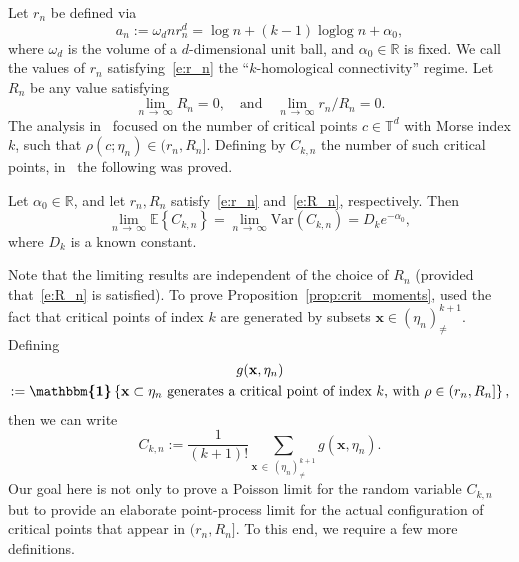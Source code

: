 \documentclass[10pt]{amsart}
\theoremstyle{definition}\newtheorem{defi}[theo]{Definition}\newtheorem{rema}[theo]{Remark}\newtheorem{exam}[theo]{Example}\newtheorem{exem}[theo]{Example}\newtheorem{nota}[theo]{Notation}
\DeclareMathOperator{\logg}{\log\log}
\newcommand{\bx}{\mathbf{x}}
\newcommand*\R{\mathbb{R}}
\newcommand*\T{\mathbb{T}}
\newcommand{\E}{\mathbb{E}}
\newcommand{\mean}[1] {\E\left\{{#1}\right\}}
\newcommand{\ind}{\boldsymbol{\mathbbm{1}}}
\newcommand{\var}[1]{\mathrm{Var}\param{{#1}}}
\newcommand{\param}[1]{\left(#1\right)}
\newcommand{\ninf}{n\,\to\,\infty}
\newcommand{\limninf}{\lim_{\ninf}}
\begin{document}
Let $r_n$ be defined via
\begin{equation}\label{e:r_n}
a_n := \omega_d nr_n^d = \log n + (k-1)\logg n + \alpha_0,
\end{equation}
where $\omega_d$ is the volume of a $d$-dimensional unit ball, and $\alpha_0\in \R$ is fixed. We call the values of $r_n$ satisfying~\eqref{e:r_n} the ``$k$-homological connectivity'' regime. Let $R_n$ be any value satisfying
\begin{equation}\label{e:R_n}
\limninf R_n =0,\quad\text{and}\quad\limninf r_n/R_n = 0.
\end{equation} The analysis in~\cite{Bobrowski2019} focused on the number of critical points $c\in \T^d$ with Morse index $k$, such that $\rho(c;\eta_n) \in (r_n,R_n]$. Defining by $C_{k,n}$ the number of such critical points, in~\cite[Proposition~4.1]{Bobrowski2019} the following was proved.

\begin{prop}\label{prop:crit_moments}
Let $\alpha_0 \in \R$, and let $r_n,R_n$ satisfy~\eqref{e:r_n} and~\eqref{e:R_n}, respectively. Then
\[
\limninf \mean{C_{k,n}} = \limninf \var{C_{k,n}} = D_k e^{-\alpha_0},
\]
where $D_k$ is a known constant.
\end{prop}

Note that the limiting results are independent of the choice of $R_n$ (provided that~\eqref{e:R_n} is satisfied). To prove Proposition~\ref{prop:crit_moments}, \cite{Bobrowski2019} used the fact that critical points of index $k$ are generated by subsets $\bx\in(\eta_n)^{k+1}_{\ne}$. Defining
\begin{multline}\label{e:g_rR}
g(\bx, \eta_n) \\
:= \ind\left\{\bx\subset \eta_n\text{ generates a critical point of index $k$, with }\rho\in (r_n,R_n]\right\},
\end{multline}
then we can write
\[
C_{k,n} := \frac{1}{(k+1)!} \sum_{\bx\,\in\,\left(\eta_n\right)^{k+1}_{\ne}} g\left(\bx,\eta_n\right).
\]
Our goal here is not only to prove a Poisson limit for the random variable $C_{k,n}$ but to provide an elaborate point-process limit for the actual configuration of critical points that appear in $(r_n,R_n]$. To this end, we require a few more definitions.
\end{document}

